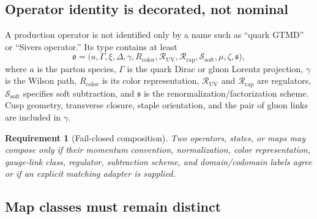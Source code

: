 \documentclass[11pt]{article}
\newtheorem{requirement}[definition]{Requirement}
\newcommand{\cR}{\mathcal R}
\newcommand{\cS}{\mathcal S}
\begin{document}
\subsection{Operator identity is decorated, not nominal}

A production operator is not identified only by a name such as
``quark GTMD'' or ``Sivers operator.''  Its type contains at least
\begin{equation}
 \mathfrak o=
 \bigl(
 a,\Gamma,\xi,\Delta,\gamma,R_{\mathrm{color}},
 \cR_{\mathrm{UV}},\cR_{\mathrm{rap}},
 \cS_{\mathrm{soft}},\mu,\zeta,\mathfrak s
 \bigr),
\label{eq:operator-type-tuple}
\end{equation}
where \(a\) is the parton species, \(\Gamma\) is the quark Dirac or gluon
Lorentz projection, \(\gamma\) is the Wilson path, \(R_{\mathrm{color}}\)
is its color representation, \(\cR_{\mathrm{UV}}\) and
\(\cR_{\mathrm{rap}}\) are regulators, \(\cS_{\mathrm{soft}}\) specifies
soft subtraction, and \(\mathfrak s\) is the renormalization/factorization
scheme.  Cusp geometry, transverse closure, staple orientation, and the pair
of gluon links are included in \(\gamma\).

\begin{requirement}[Fail-closed composition]
Two operators, states, or maps may compose only if their momentum convention,
normalization, color representation, gauge-link class, regulator, subtraction
scheme, and domain/codomain labels agree or if an explicit matching adapter
is supplied.
\end{requirement}

\subsection{Map classes must remain distinct}
\end{document}

